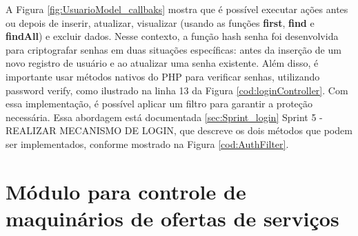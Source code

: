 A Figura \ref{fig:UsuarioModel_callbaks} mostra que é possível executar ações antes ou depois de inserir, atualizar, visualizar (usando as funções \textbf{first}, \textbf{find} e \textbf{findAll}) e excluir dados. Nesse contexto, a função hash senha foi desenvolvida para criptografar senhas em duas situações específicas: antes da inserção de um novo registro de usuário e ao atualizar uma senha existente. Além disso, é importante usar métodos nativos do PHP para verificar senhas, utilizando password verify, como ilustrado na linha 13 da Figura \ref{cod:loginController}. Com essa implementação, é possível aplicar um filtro para garantir a proteção necessária. Essa abordagem está documentada \ref{sec:Sprint_login} Sprint 5 - REALIZAR MECANISMO DE LOGIN, que descreve os dois métodos que podem ser implementados, conforme mostrado na Figura \ref{cod:AuthFilter}.



\section{Módulo para controle de maquinários de ofertas de serviços}
\label{}